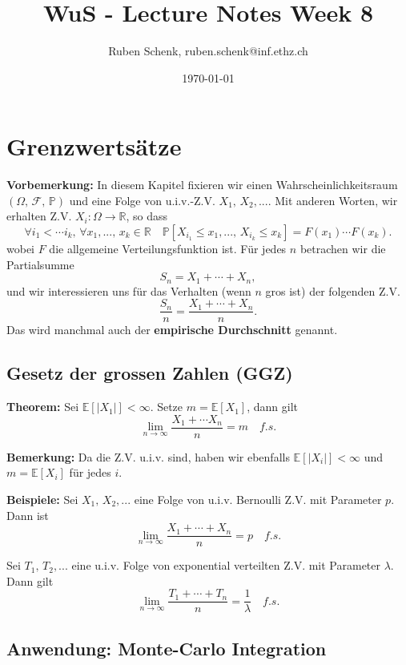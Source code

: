 \documentclass[a4paper]{extarticle}
\title{WuS - Lecture Notes Week 8}
\author{Ruben Schenk, ruben.schenk@inf.ethz.ch}
\date{\today}
\begin{document}
\maketitle

\section{Grenzwertsätze}

\textbf{Vorbemerkung:} In diesem Kapitel fixieren wir einen Wahrscheinlichkeitsraum $(\Omega, \, \mathcal{F}, \, \mathbb{P})$ und eine Folge von u.i.v.-Z.V. $X_1, \, X_2,...$. Mit anderen Worten, wir erhalten Z.V. $X_i : \Omega \to \mathbb{R}$, so dass
\[
    \forall i_1 < \cdots i_k, \, \forall x_1,..., \, x_k \in \mathbb{R} \quad \mathbb{P}[X_{i_1} \leq x_1,..., \, X_{i_k} \leq x_k] = F(x_1) \cdots F(x_k).
\]
wobei $F$ die allgemeine Verteilungsfunktion ist. Für jedes $n$ betrachen wir die Partialsumme
\[
    S_n = X_1 + \cdots + X_n,
\]
und wir interessieren uns für das Verhalten (wenn $n$ gros ist) der folgenden Z.V.
\[
    \frac{S_n}{n} = \frac{X_1 + \cdots + X_n}{n}.
\]
Das wird manchmal auch der \textbf{empirische Durchschnitt} genannt.

\subsection{Gesetz der grossen Zahlen (GGZ)}

\begin{tbox}
    \textbf{Theorem:} Sei $\mathbb{E}[|X_1|] < \infty$. Setze $m = \mathbb{E}[X_1]$, dann gilt
    \[
        \lim_{n \to \infty} \frac{X_1 + \cdots X_n}{n} = m \quad f.s.
    \]
\end{tbox}

\textbf{Bemerkung:} Da die Z.V. u.i.v. sind, haben wir ebenfalls $\mathbb{E}[|X_i|] < \infty$ und $m = \mathbb{E}[X_i]$ für jedes $i$.

\begin{ebox}
    \textbf{Beispiele:} Sei $X_1, \, X_2,...$ eine Folge von u.i.v. Bernoulli Z.V. mit Parameter $p$. Dann ist
    \[
        \lim_{n \to \infty} \frac{X_1 + \cdots + X_n}{n} = p \quad f.s.
    \]

    Sei $T_1, \, T_2,...$ eine u.i.v. Folge von exponential verteilten Z.V. mit Parameter $\lambda$. Dann gilt
    \[
        \lim_{n \to \infty} \frac{T_1 + \cdots + T_n}{n} = \frac{1}{\lambda} \quad f.s.
    \]
\end{ebox}

\subsection{Anwendung: Monte-Carlo Integration}
\end{document}
